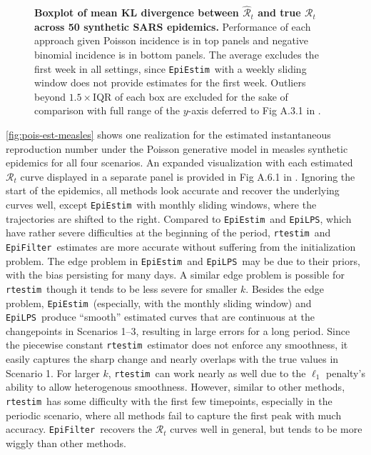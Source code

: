 \documentclass[10pt,letterpaper]{article}
\def\RtEstim{\texttt{rtestim}}
\def\EpiEstim{\texttt{EpiEstim}}
\def\EpiLPS{\texttt{EpiLPS}}
\def\EpiFilter{\texttt{EpiFilter}}
\def\calR{\mathcal{R}}
\renewcommand{\hat}{\widehat}
\begin{document}
\begin{figure}[!t]
  \centering
  \caption{{\bf Boxplot of mean KL divergence between $\hat{\calR}_t$ and true
  $\calR_t$ across 50 synthetic SARS epidemics.} Performance of each approach given Poisson
  incidence is in top panels and negative binomial incidence is in bottom panels. The
  average excludes the first week in all settings, since \EpiEstim\ with a
  weekly sliding window does not provide estimates for the first week. Outliers
  beyond $1.5\times$IQR of each box are excluded for the sake of comparison with
  full range of the $y$-axis deferred to Fig A.3.1 in .} 
  \label{fig:kl-res-sars}
\end{figure}

\autoref{fig:pois-est-measles} shows one realization for the estimated
instantaneous reproduction number under the Poisson generative model in measles
synthetic epidemics for all four scenarios. An expanded visualization with each
estimated $\calR_t$ curve displayed in a separate panel is provided in Fig
A.6.1 in . Ignoring the start of the epidemics, all methods
look accurate and recover the underlying curves well, except \EpiEstim\ with
monthly sliding windows, where the trajectories are shifted to the right.
Compared to \EpiEstim\ and \EpiLPS, which have rather severe difficulties at the
beginning of the period, \RtEstim\ and \EpiFilter\ estimates are more accurate
without suffering from the initialization problem. The edge problem in
\EpiEstim\ and \EpiLPS\ may be due to their priors, with the bias persisting for
many days. A similar edge problem is possible for \RtEstim\ though it tends to
be less severe for smaller $k$. Besides the edge problem, \EpiEstim\
(especially, with the monthly sliding window) and \EpiLPS\ produce ``smooth''
estimated curves that are continuous at the changepoints in Scenarios 1--3,
resulting in large errors for a long period. Since the piecewise constant
\RtEstim\ estimator does not enforce any smoothness, it easily
captures the sharp change and nearly overlaps with the true values in Scenario
1. For larger $k$, \RtEstim\ can work nearly as well due to the
$\ell_1$ penalty's ability to allow heterogenous smoothness. However, similar to
other methods, \RtEstim\ has some difficulty with the first few timepoints,
especially in the periodic scenario, where all methods fail to capture the first
peak with much accuracy. \EpiFilter\ recovers the $\calR_t$ curves well in
general, but tends to be more wiggly than other methods. 
\end{document}
